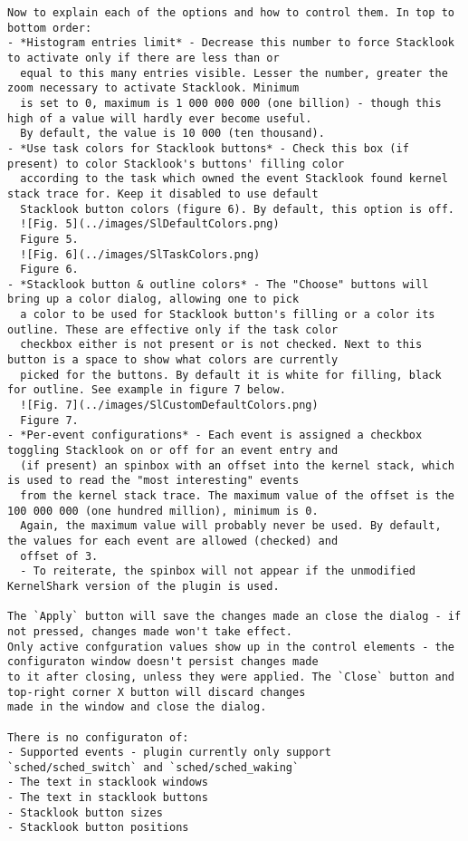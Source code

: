 \begin{verbatim}
Now to explain each of the options and how to control them. In top to bottom order:
- *Histogram entries limit* - Decrease this number to force Stacklook to activate only if there are less than or
  equal to this many entries visible. Lesser the number, greater the zoom necessary to activate Stacklook. Minimum
  is set to 0, maximum is 1 000 000 000 (one billion) - though this high of a value will hardly ever become useful.
  By default, the value is 10 000 (ten thousand).
- *Use task colors for Stacklook buttons* - Check this box (if present) to color Stacklook's buttons' filling color
  according to the task which owned the event Stacklook found kernel stack trace for. Keep it disabled to use default
  Stacklook button colors (figure 6). By default, this option is off.
  ![Fig. 5](../images/SlDefaultColors.png)
  Figure 5.
  ![Fig. 6](../images/SlTaskColors.png)
  Figure 6.
- *Stacklook button & outline colors* - The "Choose" buttons will bring up a color dialog, allowing one to pick
  a color to be used for Stacklook button's filling or a color its outline. These are effective only if the task color
  checkbox either is not present or is not checked. Next to this button is a space to show what colors are currently
  picked for the buttons. By default it is white for filling, black for outline. See example in figure 7 below.
  ![Fig. 7](../images/SlCustomDefaultColors.png)
  Figure 7.
- *Per-event configurations* - Each event is assigned a checkbox toggling Stacklook on or off for an event entry and 
  (if present) an spinbox with an offset into the kernel stack, which is used to read the "most interesting" events 
  from the kernel stack trace. The maximum value of the offset is the 100 000 000 (one hundred million), minimum is 0. 
  Again, the maximum value will probably never be used. By default, the values for each event are allowed (checked) and
  offset of 3.
  - To reiterate, the spinbox will not appear if the unmodified KernelShark version of the plugin is used. 

The `Apply` button will save the changes made an close the dialog - if not pressed, changes made won't take effect. 
Only active confguration values show up in the control elements - the configuraton window doesn't persist changes made 
to it after closing, unless they were applied. The `Close` button and top-right corner X button will discard changes 
made in the window and close the dialog.

There is no configuraton of:
- Supported events - plugin currently only support `sched/sched_switch` and `sched/sched_waking`
- The text in stacklook windows
- The text in stacklook buttons
- Stacklook button sizes
- Stacklook button positions


\end{verbatim}
